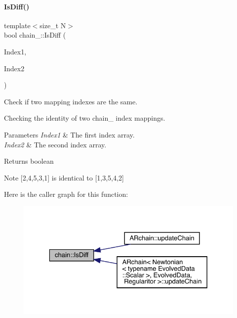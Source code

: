 \paragraph{\texorpdfstring{Is\+Diff()}{IsDiff()}}
{\footnotesize\ttfamily template$<$size\+\_\+t N$>$ \\
bool chain_\+::\+Is\+Diff (\begin{DoxyParamCaption}\item[{const \mbox{\hyperlink{namespacechain_aa40d2da395c0ac2bc5f37832442ac403}{Index\+Array}}$<$ N $>$ \&}]{Index1,  }\item[{const \mbox{\hyperlink{namespacechain_aa40d2da395c0ac2bc5f37832442ac403}{Index\+Array}}$<$ N $>$ \&}]{Index2 }\end{DoxyParamCaption})}



Check if two mapping indexes are the same. 

Checking the identity of two chain_ index mappings.
\begin{DoxyParams}{Parameters}
{\em Index1} & The first index array. \\
\hline
{\em Index2} & The second index array. \\
\hline
\end{DoxyParams}
\begin{DoxyReturn}{Returns}
boolean 
\end{DoxyReturn}
\begin{DoxyNote}{Note}
\mbox{[}2,4,5,3,1\mbox{]} is identical to \mbox{[}1,3,5,4,2\mbox{]} 
\end{DoxyNote}
Here is the caller graph for this function\+:\nopagebreak
\begin{figure}[H]
\begin{center}
\leavevmode
\includegraphics[width=323pt]{namespacechain_a874f28a6248b56c6b2b3ca45c1bbea09_icgraph}
\end{center}
\end{figure}
\mbox{\label{namespacechain_ae85619534182ce257fc47857a9c133e4}} 
